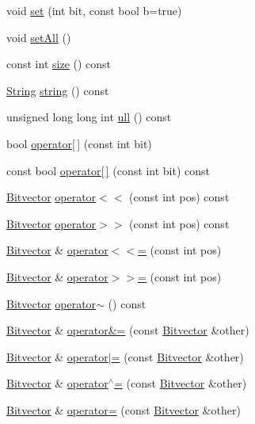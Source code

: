 \begin{DoxyCompactItemize}
\item 
void \hyperlink{classprism_1_1_bitvector_af6dd4b91e57bb6a95f30c55fdb1ce6a5}{set} (int bit, const bool b=true)
\item 
void \hyperlink{classprism_1_1_bitvector_aaa4362884a96b180fd45dd261423a7e3}{set\+All} ()
\item 
const int \hyperlink{classprism_1_1_bitvector_aefc31462d8a52013191e0df4f45ccae4}{size} () const 
\item 
\hyperlink{classprism_1_1_string}{String} \hyperlink{classprism_1_1_bitvector_abc220bdae95129cf71bb8ec70a877899}{string} () const 
\item 
unsigned long long int \hyperlink{classprism_1_1_bitvector_a63cc622f069e65f1b55e920927c3dc66}{ull} () const 
\item 
bool \hyperlink{classprism_1_1_bitvector_ab73a3eac53e5df3dc80486eddd1b8f3c}{operator\mbox{[}$\,$\mbox{]}} (const int bit)
\item 
const bool \hyperlink{classprism_1_1_bitvector_a2fcdd5ed5190df6a211e85c0b77a125a}{operator\mbox{[}$\,$\mbox{]}} (const int bit) const 
\item 
\hyperlink{classprism_1_1_bitvector}{Bitvector} \hyperlink{classprism_1_1_bitvector_a0d5163be9867dee195648df83273076a}{operator$<$$<$} (const int pos) const 
\item 
\hyperlink{classprism_1_1_bitvector}{Bitvector} \hyperlink{classprism_1_1_bitvector_a8cb5d12bfecf59503a0e9d9e4bbfa0e8}{operator$>$$>$} (const int pos) const 
\item 
\hyperlink{classprism_1_1_bitvector}{Bitvector} \& \hyperlink{classprism_1_1_bitvector_ada3bdffa3bca43fb6b5e7d96406a9dc9}{operator$<$$<$=} (const int pos)
\item 
\hyperlink{classprism_1_1_bitvector}{Bitvector} \& \hyperlink{classprism_1_1_bitvector_ada0c61efb01e9df44e8fab30788cd1fc}{operator$>$$>$=} (const int pos)
\item 
\hyperlink{classprism_1_1_bitvector}{Bitvector} \hyperlink{classprism_1_1_bitvector_ad5b9a350288e1f843f905de537215248}{operator$\sim$} () const 
\item 
\hyperlink{classprism_1_1_bitvector}{Bitvector} \& \hyperlink{classprism_1_1_bitvector_afd47ac6d8d5fbf7df4d023e7c9372910}{operator\&=} (const \hyperlink{classprism_1_1_bitvector}{Bitvector} \&other)
\item 
\hyperlink{classprism_1_1_bitvector}{Bitvector} \& \hyperlink{classprism_1_1_bitvector_a09b0870c2040786f6fbb0e261760fa2c}{operator$\vert$=} (const \hyperlink{classprism_1_1_bitvector}{Bitvector} \&other)
\item 
\hyperlink{classprism_1_1_bitvector}{Bitvector} \& \hyperlink{classprism_1_1_bitvector_af09a9046b02c3f55db4f68b6d8b3ca67}{operator$^\wedge$=} (const \hyperlink{classprism_1_1_bitvector}{Bitvector} \&other)
\item 
\hyperlink{classprism_1_1_bitvector}{Bitvector} \& \hyperlink{classprism_1_1_bitvector_add25f2ac860e58eaa9b8a72acba0c268}{operator=} (const \hyperlink{classprism_1_1_bitvector}{Bitvector} \&other)
\end{DoxyCompactItemize}
